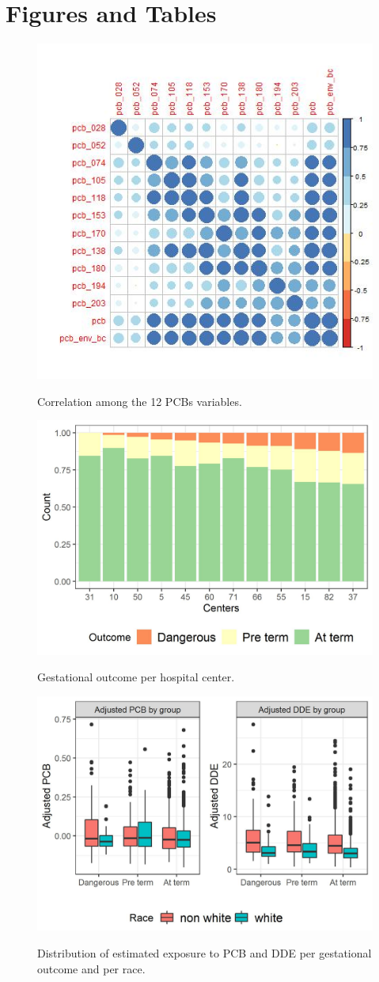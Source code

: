 \documentclass[10pt]{jmlr}%
\begin{document}
\newpage
\appendix

\section{Figures and Tables}
\label{appendix:fig}

\begin{figure}[htbp]
	\centering
	\caption{Correlation among the 12 PCBs variables.}
	\includegraphics[width=0.5\linewidth]{pcb_corr}
	\label{fig:corr}
\end{figure}

\begin{figure}[htbp]
	\centering
	\caption{Gestational outcome per hospital center.}
	\includegraphics[width=0.7\linewidth]{outcome_per_center}
	\label{fig:center}
\end{figure}

\begin{figure}[htbp]
	\centering
	\caption{Distribution of estimated exposure to PCB and DDE per gestational outcome and per race.}
	\includegraphics[width=0.7\linewidth]{pcb_dde_per_gest}
	\label{fig:pcb}
\end{figure}
\end{document}
